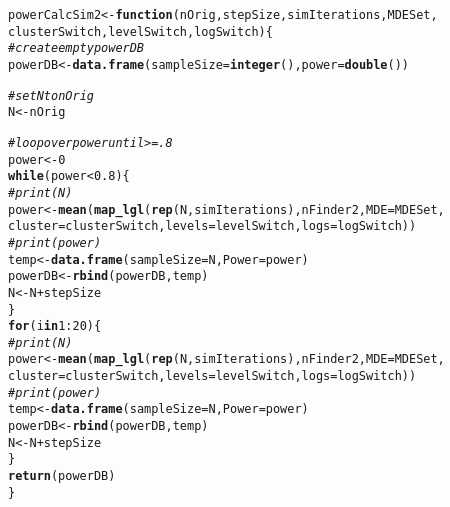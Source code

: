 \documentclass[10pt]{article}\usepackage[]{graphicx}\usepackage[]{color}
\makeatletter
\newcommand{\hlnum}[1]{\textcolor[rgb]{0.686,0.059,0.569}{#1}}%
\newcommand{\hlcom}[1]{\textcolor[rgb]{0.678,0.584,0.686}{\textit{#1}}}%
\newcommand{\hlopt}[1]{\textcolor[rgb]{0,0,0}{#1}}%
\newcommand{\hlstd}[1]{\textcolor[rgb]{0.345,0.345,0.345}{#1}}%
\newcommand{\hlkwa}[1]{\textcolor[rgb]{0.161,0.373,0.58}{\textbf{#1}}}%
\newcommand{\hlkwb}[1]{\textcolor[rgb]{0.69,0.353,0.396}{#1}}%
\newcommand{\hlkwc}[1]{\textcolor[rgb]{0.333,0.667,0.333}{#1}}%
\newcommand{\hlkwd}[1]{\textcolor[rgb]{0.737,0.353,0.396}{\textbf{#1}}}%
\newenvironment{kframe}{%
 \def\at@end@of@kframe{}%
 \ifinner\ifhmode%
  \def\at@end@of@kframe{\end{minipage}}%
  \begin{minipage}{\columnwidth}%
 \fi\fi%
 \def\FrameCommand##1{\hskip\@totalleftmargin \hskip-\fboxsep
 \colorbox{shadecolor}{##1}\hskip-\fboxsep
     \hskip-\linewidth \hskip-\@totalleftmargin \hskip\columnwidth}%
 \MakeFramed {\advance\hsize-\width
   \@totalleftmargin\z@ \linewidth\hsize
   \@setminipage}}%
 {\par\unskip\endMakeFramed%
 \at@end@of@kframe}
\newenvironment{knitrout}{}{} %
\makeatother
\begin{document}
\begin{knitrout}
\color{fgcolor}\begin{kframe}
\begin{alltt}
\hlstd{powerCalcSim2} \hlkwb{<-} \hlkwa{function}\hlstd{(}\hlkwc{nOrig}\hlstd{,} \hlkwc{stepSize}\hlstd{,} \hlkwc{simIterations}\hlstd{,} \hlkwc{MDESet}\hlstd{,}
                         \hlkwc{clusterSwitch}\hlstd{,} \hlkwc{levelSwitch}\hlstd{,} \hlkwc{logSwitch}\hlstd{)\{}
  \hlcom{# create empty powerDB}
  \hlstd{powerDB} \hlkwb{<-} \hlkwd{data.frame}\hlstd{(}\hlkwc{sampleSize} \hlstd{=} \hlkwd{integer}\hlstd{(),} \hlkwc{power} \hlstd{=} \hlkwd{double}\hlstd{())}

  \hlcom{# set N to nOrig }
  \hlstd{N} \hlkwb{<-} \hlstd{nOrig}

  \hlcom{# loop over power until >=.8}
  \hlstd{power} \hlkwb{<-} \hlnum{0}
  \hlkwa{while}\hlstd{(power} \hlopt{<} \hlnum{0.8}\hlstd{)\{}
  \hlcom{#print(N)}
  \hlstd{power} \hlkwb{<-} \hlkwd{mean}\hlstd{(}\hlkwd{map_lgl}\hlstd{(}\hlkwd{rep}\hlstd{(N,simIterations),nFinder2,} \hlkwc{MDE} \hlstd{= MDESet,}
                        \hlkwc{cluster} \hlstd{= clusterSwitch,} \hlkwc{levels} \hlstd{= levelSwitch,} \hlkwc{logs} \hlstd{= logSwitch))}
  \hlcom{#print(power)}
  \hlstd{temp} \hlkwb{<-} \hlkwd{data.frame}\hlstd{(}\hlkwc{sampleSize} \hlstd{= N,} \hlkwc{Power} \hlstd{= power)}
  \hlstd{powerDB} \hlkwb{<-} \hlkwd{rbind}\hlstd{(powerDB, temp)}
  \hlstd{N} \hlkwb{<-} \hlstd{N} \hlopt{+} \hlstd{stepSize}
  \hlstd{\}}
  \hlkwa{for}\hlstd{(i} \hlkwa{in} \hlnum{1}\hlopt{:}\hlnum{20}\hlstd{)\{}
  \hlcom{#print(N)}
  \hlstd{power} \hlkwb{<-} \hlkwd{mean}\hlstd{(}\hlkwd{map_lgl}\hlstd{(}\hlkwd{rep}\hlstd{(N,simIterations),nFinder2,} \hlkwc{MDE} \hlstd{= MDESet,}
                        \hlkwc{cluster} \hlstd{= clusterSwitch,} \hlkwc{levels} \hlstd{= levelSwitch,} \hlkwc{logs} \hlstd{= logSwitch))}
  \hlcom{#print(power)}
  \hlstd{temp} \hlkwb{<-} \hlkwd{data.frame}\hlstd{(}\hlkwc{sampleSize} \hlstd{= N,} \hlkwc{Power} \hlstd{= power)}
  \hlstd{powerDB} \hlkwb{<-} \hlkwd{rbind}\hlstd{(powerDB, temp)}
  \hlstd{N} \hlkwb{<-} \hlstd{N} \hlopt{+} \hlstd{stepSize}
  \hlstd{\}}
  \hlkwd{return}\hlstd{(powerDB)}
\hlstd{\}}
\end{alltt}
\end{kframe}
\end{knitrout}
\end{document}
